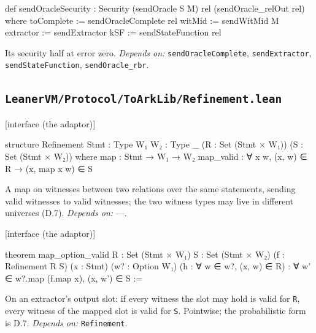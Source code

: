 \begin{leancode}
def sendOracleSecurity : Security (sendOracle S M) rel (sendOracle_relOut rel) where
  toComplete := sendOracleComplete rel
  witMid := sendWitMid M
  extractor := sendExtractor
  kSF := sendStateFunction rel
\end{leancode}


Its security half at error zero. \emph{Depends on:} \texttt{sendOracleComplete}, \texttt{sendExtractor}, \texttt{sendStateFunction}, \texttt{sendOracle\_\allowbreak{}rbr}.

\subsection{\texttt{LeanerVM/Protocol/ToArkLib/Refinement.lean}}\label{sec:gen-cat-spine-Refinement}

\par\medskip\noindent\textbf{}\hfill\textsf{\small [interface (the adaptor)]}\par\nopagebreak

\begin{leancode}
structure Refinement {Stmt : Type} {W₁ W₂ : Type _} (R : Set (Stmt × W₁))
    (S : Set (Stmt × W₂)) where
  map : Stmt → W₁ → W₂
  map_valid : ∀ x w, (x, w) ∈ R → (x, map x w) ∈ S
\end{leancode}


A map on witnesses between two relations over the same statements, sending valid witnesses to valid witnesses; the two witness types may live in different universes (D.7). \emph{Depends on:} —.

\par\medskip\noindent\textbf{}\hfill\textsf{\small [interface (the adaptor)]}\par\nopagebreak

\begin{leancode}
theorem map_option_valid {R : Set (Stmt × W₁)} {S : Set (Stmt × W₂)} (f : Refinement R S)
    (x : Stmt) (w? : Option W₁) (h : ∀ w ∈ w?, (x, w) ∈ R) :
    ∀ w' ∈ w?.map (f.map x), (x, w') ∈ S :=
\end{leancode}


On an extractor's output slot: if every witness the slot may hold is valid for \texttt{R}, every witness of the mapped slot is valid for \texttt{S}. Pointwise; the probabilistic form is D.7. \emph{Depends on:} \texttt{Refinement}.

